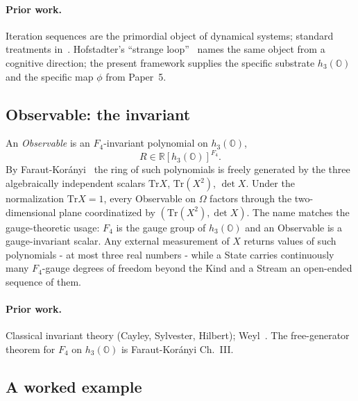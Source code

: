 \documentclass[12pt]{article}
\theoremstyle{remark}
\newcommand{\hthree}{h_3(\mathbb{O})}
\newcommand{\Ffour}{F_4}
\newcommand{\Tr}{\mathrm{Tr}}
\begin{document}
\paragraph{Prior work.} Iteration sequences are the primordial object
of dynamical systems; standard treatments
in~\cite{devaney1989, katok-hasselblatt1995}. Hofstadter's ``strange
loop''~\cite{hofstadter1979, hofstadter2007} names the same object
from a cognitive direction; the present framework supplies the
specific substrate $\hthree$ and the specific map $\phi$ from Paper~5.

\subsection{Observable: the invariant}
\label{sec:observable}

An \emph{Observable} is an $\Ffour$-invariant polynomial on $\hthree$,
\begin{equation}\label{eq:observable-space}
  R \in \mathbb{R}[\hthree]^{\Ffour}.
\end{equation}
By Faraut-Kor\'anyi~\cite{faraut-koranyi1994} the ring of such
polynomials is freely generated by the three algebraically independent
scalars $\Tr X$, $\Tr(X^2)$, $\det X$. Under the normalization
$\Tr X = 1$, every Observable on $\Omega$ factors through the
two-dimensional plane coordinatized by $(\Tr(X^2), \det X)$. The name
matches the gauge-theoretic usage: $\Ffour$ is the gauge group of
$\hthree$ and an Observable is a gauge-invariant scalar. Any external
measurement of $X$ returns values of such polynomials - at most three
real numbers - while a State carries continuously many
$\Ffour$-gauge degrees of freedom beyond the Kind and a Stream an
open-ended sequence of them.

\paragraph{Prior work.} Classical invariant theory (Cayley, Sylvester,
Hilbert); Weyl~\cite{weyl1939}. The free-generator theorem for $\Ffour$
on $\hthree$ is Faraut-Kor\'anyi Ch.~III.

\subsection{A worked example}
\label{sec:worked}
\end{document}
